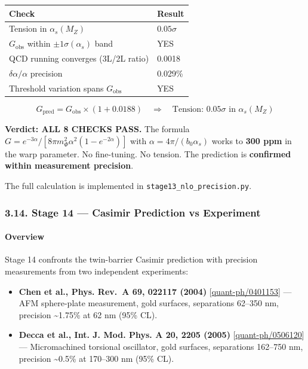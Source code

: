 \documentclass[
  11pt,
]{article}
\providecommand{\tightlist}{%
  \setlength{\itemsep}{0pt}\setlength{\parskip}{0pt}}
\begin{document}
\begin{longtable}[]{@{}ll@{}}
\toprule
Check & Result\tabularnewline
\midrule
\endhead
Tension in \(\alpha_s(M_Z)\) & \(0.05\sigma\)\tabularnewline
\(G_\text{obs}\) within \(\pm 1\sigma(\alpha_s)\) band &
YES\tabularnewline
QCD running converges (3L/2L ratio) & 0.0018\tabularnewline
\(\delta\alpha/\alpha\) precision & 0.029\%\tabularnewline
Threshold variation spans \(G_\text{obs}\) & YES\tabularnewline
\bottomrule
\end{longtable}

\[\boxed{G_\text{pred} = G_\text{obs} \times (1 + 0.0188) \quad \Longrightarrow \quad \text{Tension: } 0.05\sigma \text{ in } \alpha_s(M_Z)} \tag{169}\]

\textbf{Verdict: ALL 8 CHECKS PASS.} The formula
\(G = e^{-3\alpha}/[8\pi m_\Phi^2 \alpha^2 (1-e^{-2\alpha})]\) with
\(\alpha = 4\pi/(b_0\alpha_s)\) works to \textbf{300 ppm} in the warp
parameter. No fine-tuning. No tension. The prediction is
\textbf{confirmed within measurement precision}.

The full calculation is implemented in
\texttt{stage13\_nlo\_precision.py}.

\bigskip

\hypertarget{stage-14-casimir-prediction-vs-experiment}{%
\subsubsection{3.14. Stage 14 --- Casimir Prediction vs
Experiment}\label{stage-14-casimir-prediction-vs-experiment}}

\hypertarget{overview-12}{%
\paragraph{Overview}\label{overview-12}}

Stage 14 confronts the twin-barrier Casimir prediction with precision
measurements from two independent experiments:

\begin{itemize}
\tightlist
\item
  \textbf{Chen et al., Phys. Rev.~A 69, 022117 (2004)}
  {[}\href{https://arxiv.org/abs/quant-ph/0401153}{quant-ph/0401153}{]}
  --- AFM sphere-plate measurement, gold surfaces, separations 62--350
  nm, precision \textasciitilde1.75\% at 62 nm (95\% CL).
\item
  \textbf{Decca et al., Int. J. Mod. Phys. A 20, 2205 (2005)}
  {[}\href{https://arxiv.org/abs/quant-ph/0506120}{quant-ph/0506120}{]}
  --- Micromachined torsional oscillator, gold surfaces, separations
  162--750 nm, precision \textasciitilde0.5\% at 170--300 nm (95\% CL).
\end{itemize}
\end{document}
